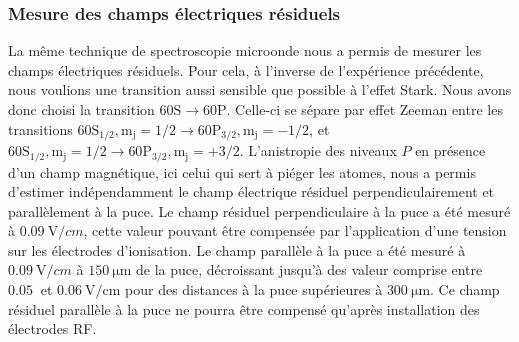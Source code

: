 \subsubsection*{Mesure des champs électriques résiduels}
\noindent La même technique de spectroscopie microonde nous a permis de mesurer les champs électriques résiduels.
Pour cela, à l'inverse de l'expérience précédente, nous voulions une transition aussi sensible que possible à l'effet Stark.
Nous avons donc choisi la transition $\mathrm{60S}\rightarrow\mathrm{60P}$.
Celle-ci se sépare par effet Zeeman entre les transitions $\mathrm{60S_{1/2},m_j=1/2} \rightarrow \mathrm{60P_{3/2},m_j=-1/2}$,
et $\mathrm{60S_{1/2},m_j=1/2} \rightarrow \mathrm{60P_{3/2},m_j=+3/2}$.
L'anistropie des niveaux $P$ en présence d'un champ magnétique, ici celui qui sert à piéger les atomes, nous a permis d'estimer indépendamment le champ électrique résiduel perpendiculairement et parallèlement à la puce.
Le champ résiduel perpendiculaire à la puce a été mesuré à $\SI{0.09}{\V/cm}$, cette valeur pouvant être compensée par l'application d'une tension sur les électrodes d'ionisation.
Le champ parallèle à la puce a été mesuré à $\SI{0.09}{\V/cm}$ à $\SI{150}{\um}$ de la puce, décroissant jusqu'à des valeur comprise entre $\SI{0.05}{}$ et $\SI{0.06}{\V/\cm}$ pour des distances à la puce supérieures à $\SI{300}{\um}$.
Ce champ résiduel parallèle à la puce ne pourra être compensé qu'après installation des électrodes RF.

